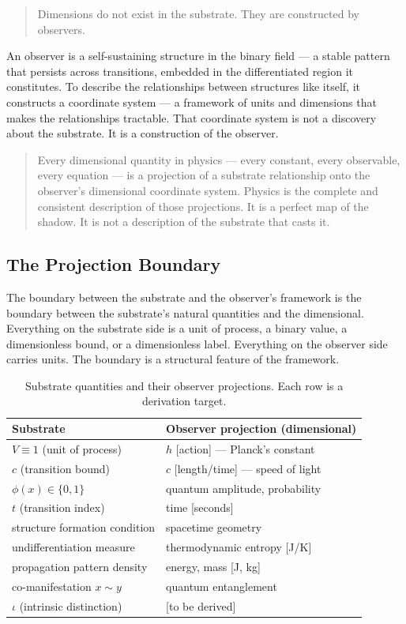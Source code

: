 \documentclass[11pt,letterpaper]{article}
\begin{document}
\begin{quote}
Dimensions do not exist in the substrate. They are constructed by observers.
\end{quote}

An observer is a self-sustaining structure in the binary field --- a stable pattern that persists across transitions, embedded in the differentiated region it constitutes. To describe the relationships between structures like itself, it constructs a coordinate system --- a framework of units and dimensions that makes the relationships tractable. That coordinate system is not a discovery about the substrate. It is a construction of the observer.

\begin{quote}
Every dimensional quantity in physics --- every constant, every observable, every equation --- is a projection of a substrate relationship onto the observer's dimensional coordinate system. Physics is the complete and consistent description of those projections. It is a perfect map of the shadow. It is not a description of the substrate that casts it.
\end{quote}
\subsection{The Projection Boundary}
\label{sec:orgf8671a3}

The boundary between the substrate and the observer's framework is the boundary between the substrate's natural quantities and the dimensional. Everything on the substrate side is a unit of process, a binary value, a dimensionless bound, or a dimensionless label. Everything on the observer side carries units. The boundary is a structural feature of the framework.

\begin{table}[htbp]
\caption{Substrate quantities and their observer projections. Each row is a derivation target.}
\centering
\begin{tabular}{lp{6cm}}
\toprule
\textbf{Substrate} & \textbf{Observer projection (dimensional)}\\
\midrule
\(V \equiv 1\) (unit of process) & \(h\) {[}action] --- Planck's constant\\
\(c\) (transition bound) & \(c\) {[}length/time] --- speed of light\\
\(\phi(x) \in \{0, 1\}\) & quantum amplitude, probability\\
\(t\) (transition index) & time [seconds]\\
structure formation condition & spacetime geometry\\
undifferentiation measure & thermodynamic entropy [J/K]\\
propagation pattern density & energy, mass [J, kg]\\
co-manifestation \(x \sim y\) & quantum entanglement\\
\(\iota\) (intrinsic distinction) & {[}to be derived]\\
\bottomrule
\end{tabular}
\end{table}
\end{document}
